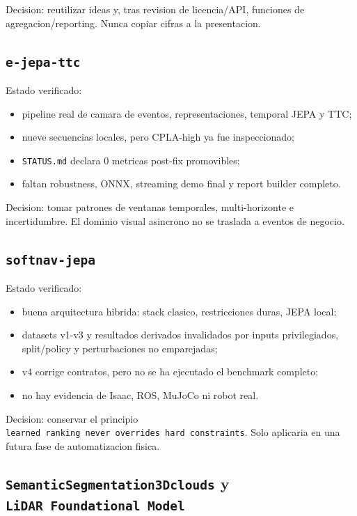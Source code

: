 \documentclass[
  spanish,
  10pt,
  a4paper,
]{article}
\providecommand{\tightlist}{%
  \setlength{\itemsep}{0pt}\setlength{\parskip}{0pt}}
\begin{document}
Decision: reutilizar ideas y, tras revision de licencia/API, funciones
de agregacion/reporting. Nunca copiar cifras a la presentacion.

\subsection{\texorpdfstring{\texttt{e-jepa-ttc}}{e-jepa-ttc}}\label{e-jepa-ttc}

Estado verificado:

\begin{itemize}
\tightlist
\item
  pipeline real de camara de eventos, representaciones, temporal JEPA y
  TTC;
\item
  nueve secuencias locales, pero CPLA-high ya fue inspeccionado;
\item
  \texttt{STATUS.md} declara 0 metricas post-fix promovibles;
\item
  faltan robustness, ONNX, streaming demo final y report builder
  completo.
\end{itemize}

Decision: tomar patrones de ventanas temporales, multi-horizonte e
incertidumbre. El dominio visual asincrono no se traslada a eventos de
negocio.

\subsection{\texorpdfstring{\texttt{softnav-jepa}}{softnav-jepa}}\label{softnav-jepa}

Estado verificado:

\begin{itemize}
\tightlist
\item
  buena arquitectura hibrida: stack clasico, restricciones duras, JEPA
  local;
\item
  datasets v1-v3 y resultados derivados invalidados por inputs
  privilegiados, split/policy y perturbaciones no emparejadas;
\item
  v4 corrige contratos, pero no se ha ejecutado el benchmark completo;
\item
  no hay evidencia de Isaac, ROS, MuJoCo ni robot real.
\end{itemize}

Decision: conservar el principio
\texttt{learned\ ranking\ never\ overrides\ hard\ constraints}. Solo
aplicaria en una futura fase de automatizacion fisica.

\subsection{\texorpdfstring{\texttt{SemanticSegmentation3Dclouds} y
\texttt{LiDAR\ Foundational\ Model}}{SemanticSegmentation3Dclouds y LiDAR Foundational Model}}\label{semanticsegmentation3dclouds-y-lidar-foundational-model}
\end{document}

